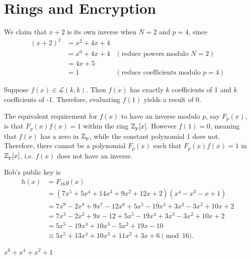 \section{Rings and Encryption}
\begin{questions}
    \item We claim that $x+2$ is its own inverse when $N = 2$ and $p = 4$, since
    \begin{align*}
        (x+2)^2 &= x^2 + 4x + 4\\
        &= x^0 + 4x + 4 & (\text{reduce powers modulo } N = 2)\\
        &= 4x + 5\\
        &= 1 & (\text{reduce coefficients modulo } p = 4)
    \end{align*}

    \item Suppose $f(x) \in \mathcal{L}(k,k)$. Then $f(x)$ has exactly $k$ coefficients of 1 and $k$ coefficients of -1. Therefore, evaluating $f(1)$ yields a result of 0.
    
    The equivalent requirement for $f(x)$ to have an inverse modulo $p$, say $F_p(x)$, is that $F_p(x)f(x) = 1$ within the ring $\mathbb{Z}_p[x]$. However $f(1) = 0$, meaning that $f(x)$ has a zero in $\mathbb{Z}_p$, while the constant polynomial 1 does not. Therefore, there cannot be a polynomial $F_p(x)$ such that $F_p(x)f(x) = 1$ in $\mathbb{Z}_p[x]$, i.e. $f(x)$ does not have an inverse.

    \item Bob's public key is
    \begin{align*}
        h(x) &= F_{16}g(x)\\
        &= (7x^5 + 5x^4 + 14x^3 + 9x^2 + 12x + 2)(x^4 - x^3 - x + 1)\\
        &= 7x^9 - 2x^8 + 9x^7 - 12x^6 + 5x^5 - 19x^4 + 3x^3 - 3x^2 + 10x + 2\\
        &= 7x^3 - 2x^2 + 9x - 12 + 5x^5 - 19x^4 + 3x^3 - 3x^2 + 10x + 2\\
        &= 5x^5 - 19x^4 + 10x^3 - 5x^2 + 19x - 10\\
        &\equiv 5x^5 + 13x^4 + 10x^3 + 11x^2 + 3x + 6 \pmod{16}.
    \end{align*}

    \item $x^6 + x^4 + x^2 + 1$
    

\end{questions}
